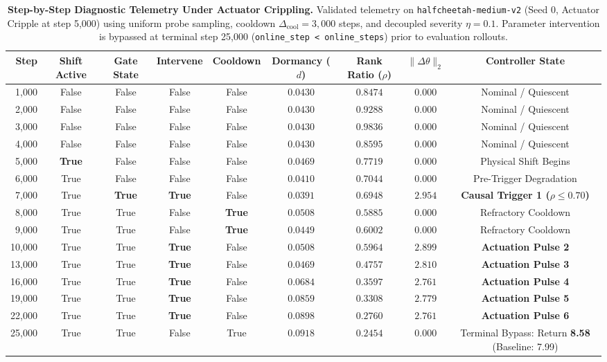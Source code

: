 \documentclass{article}
\begin{document}
\begin{table}[h]
\caption{\textbf{Step-by-Step Diagnostic Telemetry Under Actuator Crippling.} Validated telemetry on \texttt{halfcheetah-medium-v2} (Seed 0, Actuator Cripple at step 5,000) using uniform probe sampling, cooldown $\Delta_{\mathrm{cool}} = 3,000$ steps, and decoupled severity $\eta = 0.1$. Parameter intervention is bypassed at terminal step 25,000 (\texttt{online\_step < online\_steps}) prior to evaluation rollouts.}
\label{tab:telemetry_audit}
\centering
\scriptsize
\begin{tabular}{rcccccccc}
\toprule
\textbf{Step} & \textbf{Shift Active} & \textbf{Gate State} & \textbf{Intervene} & \textbf{Cooldown} & \textbf{Dormancy ($d$)} & \textbf{Rank Ratio ($\rho$)} & \textbf{$\|\Delta \theta\|_2$} & \textbf{Controller State} \\
\midrule
1,000 & False & False & False & False & $0.0430$ & $0.8474$ & $0.000$ & Nominal / Quiescent \\
2,000 & False & False & False & False & $0.0430$ & $0.9288$ & $0.000$ & Nominal / Quiescent \\
3,000 & False & False & False & False & $0.0430$ & $0.9836$ & $0.000$ & Nominal / Quiescent \\
4,000 & False & False & False & False & $0.0430$ & $0.8595$ & $0.000$ & Nominal / Quiescent \\
\midrule
5,000 & \textbf{True} & False & False & False & $0.0469$ & $0.7719$ & $0.000$ & Physical Shift Begins \\
6,000 & True & False & False & False & $0.0410$ & $0.7044$ & $0.000$ & Pre-Trigger Degradation \\
\midrule
7,000 & True & \textbf{True} & \textbf{True} & False & $0.0391$ & $0.6948$ & $2.954$ & \textbf{Causal Trigger 1 ($\rho \le 0.70$)} \\
8,000 & True & True & False & \textbf{True} & $0.0508$ & $0.5885$ & $0.000$ & Refractory Cooldown \\
9,000 & True & True & False & \textbf{True} & $0.0449$ & $0.6002$ & $0.000$ & Refractory Cooldown \\
\midrule
10,000 & True & True & \textbf{True} & False & $0.0508$ & $0.5964$ & $2.899$ & \textbf{Actuation Pulse 2} \\
13,000 & True & True & \textbf{True} & False & $0.0469$ & $0.4757$ & $2.810$ & \textbf{Actuation Pulse 3} \\
16,000 & True & True & \textbf{True} & False & $0.0684$ & $0.3597$ & $2.761$ & \textbf{Actuation Pulse 4} \\
19,000 & True & True & \textbf{True} & False & $0.0859$ & $0.3308$ & $2.779$ & \textbf{Actuation Pulse 5} \\
22,000 & True & True & \textbf{True} & False & $0.0898$ & $0.2760$ & $2.761$ & \textbf{Actuation Pulse 6} \\
\midrule
25,000 & True & True & False & True & $0.0918$ & $0.2454$ & $0.000$ & Terminal Bypass: Return \textbf{8.58} (Baseline: 7.99) \\
\bottomrule
\end{tabular}
\end{table}
\end{document}
